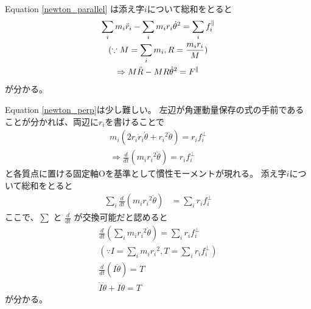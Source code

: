 \documentclass[a4paper,11pt]{jsarticle}
\begin{document}
Equation \ref{newton_parallel} は添え字$i$について総和をとると
\begin{gather*}
  \sum_i m_i \ddot{r}_i - \sum_i m_i r_i \dot{\theta}^2 = \sum_i f_i^\parallel
  \\
  (\because M = \sum_i m_i, R = \frac{m_i r_i}{M}) \notag
  \\
  \Rightarrow M \ddot{R} - M R \dot{\theta}^2 = F^\parallel
\end{gather*}
が分かる。

Equation \ref{newton_perp}は少し難しい。
左辺が角運動量保存の式の手前であることが分かれば、両辺に$r_i$を書けることで
\begin{gather*}
  m_i (2 r_i \dot{r}_i \dot{\theta} + {r_i}^2 \ddot{\theta}) = r_i f_i^\perp
  \\
  \Rightarrow
  \frac{d}{dt} (m_i {r_i}^2 \dot{\theta} ) = r_i f_i^\perp
\end{gather*}
と各質点に置ける固定軸$\mathrm{O}$を基準として慣性モーメントが現れる。
添え字$i$について総和をとると
\begin{align*}
  \sum_i \frac{d}{dt} (m_i {r_i}^2 \dot{\theta} ) &= \sum_i r_i f_i^\perp
\end{align*}
ここで、$\sum$ と $\frac{d}{dt}$ が交換可能だと認めると
\begin{gather*}
  \frac{d}{dt} \left( \sum_i m_i {r_i}^2 \dot{\theta} \right) = \sum_i r_i f_i^\perp
  \\
  (\because I = \sum_i m_i {r_i}^2, T = \sum_i r_i f_i^\perp)
  \\
  \frac{d}{dt} \left( I \dot{\theta} \right) = T
  \\
  \dot{I} \dot{\theta} + I \ddot{\theta} = T
\end{gather*}
が分かる。
\end{document}
